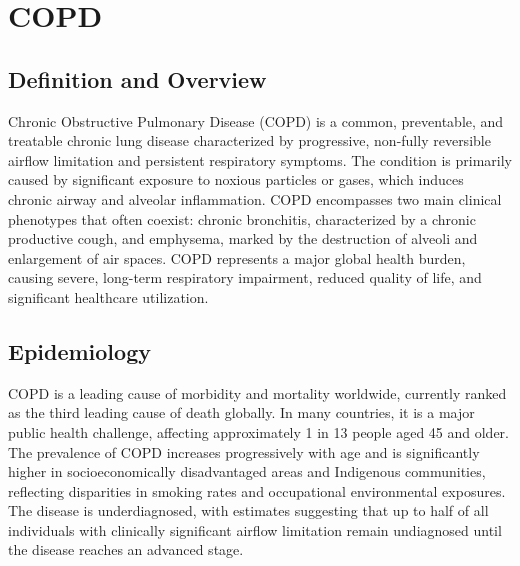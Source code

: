 \chapter{COPD}

\section*{Definition and Overview}
Chronic Obstructive Pulmonary Disease (COPD) is a common, preventable, and treatable chronic lung disease characterized by progressive, non-fully reversible airflow limitation and persistent respiratory symptoms. The condition is primarily caused by significant exposure to noxious particles or gases, which induces chronic airway and alveolar inflammation. COPD encompasses two main clinical phenotypes that often coexist: chronic bronchitis, characterized by a chronic productive cough, and emphysema, marked by the destruction of alveoli and enlargement of air spaces. COPD represents a major global health burden, causing severe, long-term respiratory impairment, reduced quality of life, and significant healthcare utilization.

\section*{Epidemiology}
COPD is a leading cause of morbidity and mortality worldwide, currently ranked as the third leading cause of death globally. In many countries, it is a major public health challenge, affecting approximately 1 in 13 people aged 45 and older. The prevalence of COPD increases progressively with age and is significantly higher in socioeconomically disadvantaged areas and Indigenous communities, reflecting disparities in smoking rates and occupational environmental exposures. The disease is underdiagnosed, with estimates suggesting that up to half of all individuals with clinically significant airflow limitation remain undiagnosed until the disease reaches an advanced stage.

